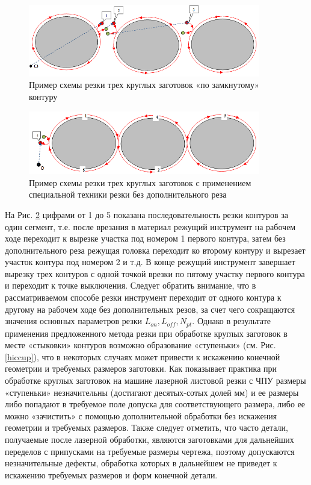 \documentclass{article}
\begin{document}
\begin{figure}
  \begin{center}
  \includegraphics[width=0.9\textwidth]{3-3.png}
  \caption{Пример схемы резки трех круглых заготовок «по замкнутому» контуру}
  \label{3-3}
  \end{center}
\end{figure}

\begin{figure}
  \begin{center}
  \includegraphics[width=0.9\textwidth]{3-1.png}
  \caption{Пример схемы резки трех круглых заготовок с применением специальной техники резки без дополнительного реза}
  \label{3-1}
  \end{center}
\end{figure}

На Рис. \ref{3-1}
цифрами от 1 до 5 показана последовательность
резки контуров за один сегмент,
т.е. после врезания в материал режущий инструмент
на рабочем ходе переходит к вырезке участка
под номером 1 первого контура,
затем без дополнительного реза режущая головка
переходит ко второму контуру и вырезает участок
контура под номером 2 и т.д.
В конце режущий инструмент завершает
вырезку трех контуров с одной точкой
врезки по пятому участку первого контура и
переходит к точке выключения.
Следует обратить внимание, что в рассматриваемом
способе резки инструмент переходит от одного контура к
другому на рабочем ходе без дополнительных резов,
за счет чего сокращаются значения основных параметров резки
$L_{on}, L_{off}, N_{pt}$.
Однако в результате применения предложенного метода
резки при обработке круглых заготовок в месте «стыковки»
контуров возможно образование «ступеньки»
(см. Рис. \ref{hiccup}),
что в некоторых случаях может привести к
искажению конечной геометрии и требуемых размеров заготовки.
Как показывает практика при обработке круглых заготовок на
машине лазерной листовой резки с ЧПУ размеры «ступеньки» незначительны
(достигают десятых-сотых долей мм)
и ее размеры либо попадают в требуемое поле допуска
для соответствующего размера, либо ее можно «зачистить»
с помощью дополнительной обработки без искажения геометрии и требуемых размеров.
Также следует отметить, что часто детали,
получаемые после лазерной обработки,
являются заготовками для дальнейших переделов с
припусками на требуемые размеры чертежа,
поэтому допускаются незначительные дефекты,
обработка которых в дальнейшем не приведет к
искажению требуемых размеров и форм конечной детали.
\end{document}

